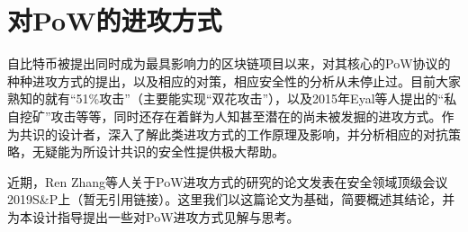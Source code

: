 \section{对PoW的进攻方式}
\label{ch:attack}
自比特币被提出同时成为最具影响力的区块链项目以来，对其核心的PoW协议的种种进攻方式的提出，以及相应的对策，相应安全性的分析从未停止过。目前大家熟知的就有“51\%攻击”（主要能实现“双花攻击”），以及2015年Eyal等人提出的“私自挖矿”攻击等等，同时还存在着鲜为人知甚至潜在的尚未被发掘的进攻方式。作为共识的设计者，深入了解此类进攻方式的工作原理及影响，并分析相应的对抗策略，无疑能为所设计共识的安全性提供极大帮助。

近期，Ren Zhang等人关于PoW进攻方式的研究的论文发表在安全领域顶级会议2019S\&P上（暂无引用链接）。这里我们以这篇论文为基础，简要概述其结论，并为本设计指导提出一些对PoW进攻方式见解与思考。

